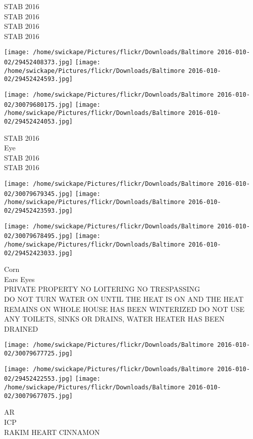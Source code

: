 \documentclass[10pt,letterpaper]{article}
\begin{document}
STAB 2016\\
STAB 2016\\
STAB 2016\\
STAB 2016\\
\pagebreak

\texttt{[image: /home/swickape/Pictures/flickr/Downloads/Baltimore 2016-010-02/29452408373.jpg]}
\texttt{[image: /home/swickape/Pictures/flickr/Downloads/Baltimore 2016-010-02/29452424593.jpg]}

\texttt{[image: /home/swickape/Pictures/flickr/Downloads/Baltimore 2016-010-02/30079680175.jpg]}
\texttt{[image: /home/swickape/Pictures/flickr/Downloads/Baltimore 2016-010-02/29452424053.jpg]}

STAB 2016\\
Eye\\
STAB 2016\\
STAB 2016\\
\pagebreak

\texttt{[image: /home/swickape/Pictures/flickr/Downloads/Baltimore 2016-010-02/30079679345.jpg]}
\texttt{[image: /home/swickape/Pictures/flickr/Downloads/Baltimore 2016-010-02/29452423593.jpg]}

\texttt{[image: /home/swickape/Pictures/flickr/Downloads/Baltimore 2016-010-02/30079678495.jpg]}
\texttt{[image: /home/swickape/Pictures/flickr/Downloads/Baltimore 2016-010-02/29452423033.jpg]}

Corn\\
Ears Eyes\\
PRIVATE PROPERTY NO LOITERING NO TRESPASSING\\
DO NOT TURN WATER ON UNTIL THE HEAT IS ON AND THE HEAT REMAINS ON WHOLE HOUSE HAS BEEN WINTERIZED DO NOT USE ANY TOILETS, SINKS OR DRAINS, WATER HEATER HAS BEEN DRAINED\\
\pagebreak

\texttt{[image: /home/swickape/Pictures/flickr/Downloads/Baltimore 2016-010-02/30079677725.jpg]}

\vspace{0.25in}
\texttt{[image: /home/swickape/Pictures/flickr/Downloads/Baltimore 2016-010-02/29452422553.jpg]}
\texttt{[image: /home/swickape/Pictures/flickr/Downloads/Baltimore 2016-010-02/30079677075.jpg]}

AR\\
ICP\\
RAKIM HEART CINNAMON\\
\pagebreak
\end{document}
